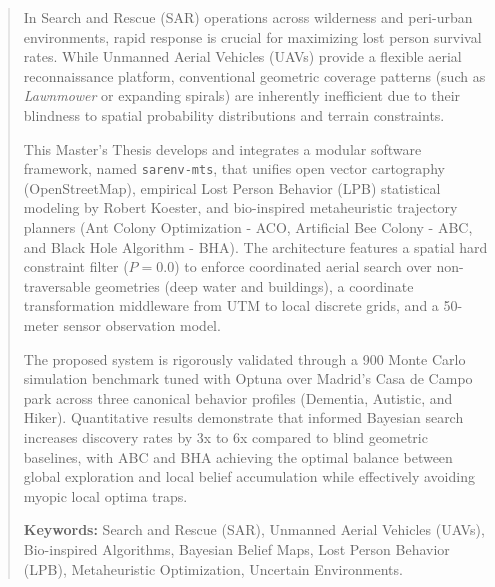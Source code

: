 \documentclass[12pt]{report} %
\begin{document}
\newpage %
\thispagestyle{empty}
\mbox{}

\renewcommand\abstractname{\large\bfseries\filcenter\uppercase{Abstract}}
\begin{abstract}
\thispagestyle{plain}
	
In Search and Rescue (SAR) operations across wilderness and peri-urban environments, rapid response is crucial for maximizing lost person survival rates. While Unmanned Aerial Vehicles (UAVs) provide a flexible aerial reconnaissance platform, conventional geometric coverage patterns (such as \textit{Lawnmower} or expanding spirals) are inherently inefficient due to their blindness to spatial probability distributions and terrain constraints. 

This Master's Thesis develops and integrates a modular software framework, named \texttt{sarenv-mts}, that unifies open vector cartography (OpenStreetMap), empirical Lost Person Behavior (LPB) statistical modeling by Robert Koester, and bio-inspired metaheuristic trajectory planners (Ant Colony Optimization - ACO, Artificial Bee Colony - ABC, and Black Hole Algorithm - BHA). The architecture features a spatial hard constraint filter ($P=0.0$) to enforce coordinated aerial search over non-traversable geometries (deep water and buildings), a coordinate transformation middleware from UTM to local discrete grids, and a 50-meter sensor observation model. 

The proposed system is rigorously validated through a 900 Monte Carlo simulation benchmark tuned with Optuna over Madrid's Casa de Campo park across three canonical behavior profiles (Dementia, Autistic, and Hiker). Quantitative results demonstrate that informed Bayesian search increases discovery rates by 3x to 6x compared to blind geometric baselines, with ABC and BHA achieving the optimal balance between global exploration and local belief accumulation while effectively avoiding myopic local optima traps.
	
\vspace{0.5cm}
\noindent\textbf{Keywords:} Search and Rescue (SAR), Unmanned Aerial Vehicles (UAVs), Bio-inspired Algorithms, Bayesian Belief Maps, Lost Person Behavior (LPB), Metaheuristic Optimization, Uncertain Environments.
	
\vfill
\end{abstract}

	\newpage %
	\thispagestyle{empty}
	\mbox{}
\end{document}
